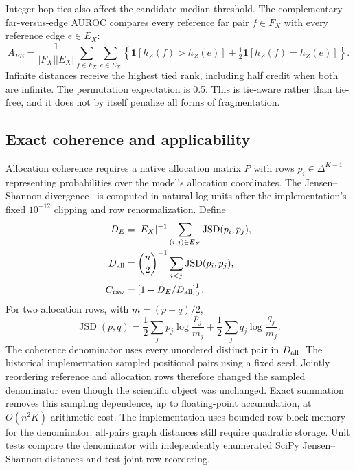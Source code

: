 \documentclass[11pt]{article}
\begin{document}
Integer-hop ties also affect the candidate-median threshold. The complementary far-versus-edge AUROC compares every reference far pair $f\in F_X$ with every reference edge $e\in E_X$:
\begin{equation}
 A_{FE}=\frac{1}{|F_X||E_X|}\sum_{f\in F_X}\sum_{e\in E_X}
 \left\{\mathbf 1[h_Z(f)>h_Z(e)]+\tfrac12\mathbf 1[h_Z(f)=h_Z(e)]\right\}.
\end{equation}
Infinite distances receive the highest tied rank, including half credit when both are infinite. The permutation expectation is 0.5. This is tie-aware rather than tie-free, and it does not by itself penalize all forms of fragmentation.



\subsection{Exact coherence and applicability}

Allocation coherence requires a native allocation matrix $P$ with rows $p_i\in\Delta^{K-1}$ representing probabilities over the model's allocation coordinates. The Jensen--Shannon divergence~\cite{lin1991divergence} is computed in natural-log units after the implementation's fixed $10^{-12}$ clipping and row renormalization. Define
\begin{align}
 D_E &= |E_X|^{-1}\sum_{(i,j)\in E_X}\operatorname{JSD}(p_i,p_j),\\
 D_{\rm all} &= {\binom n2}^{-1}\sum_{i<j}\operatorname{JSD}(p_i,p_j),\\
 C_{\rm raw} &= \left[1-D_E/D_{\rm all}\right]_0^1.
\end{align}
For two allocation rows, with $m=(p+q)/2$,
\begin{equation}
 \operatorname{JSD}(p,q)=\frac12\sum_jp_j\log\frac{p_j}{m_j}
                         +\frac12\sum_jq_j\log\frac{q_j}{m_j}.
\end{equation}
The coherence denominator uses every unordered distinct pair in $D_{\rm all}$. The historical implementation sampled positional pairs using a fixed seed. Jointly reordering reference and allocation rows therefore changed the sampled denominator even though the scientific object was unchanged. Exact summation removes this sampling dependence, up to floating-point accumulation, at $O(n^2K)$ arithmetic cost. The implementation uses bounded row-block memory for the denominator; all-pairs graph distances still require quadratic storage. Unit tests compare the denominator with independently enumerated SciPy Jensen--Shannon distances and test joint row reordering.
\end{document}
